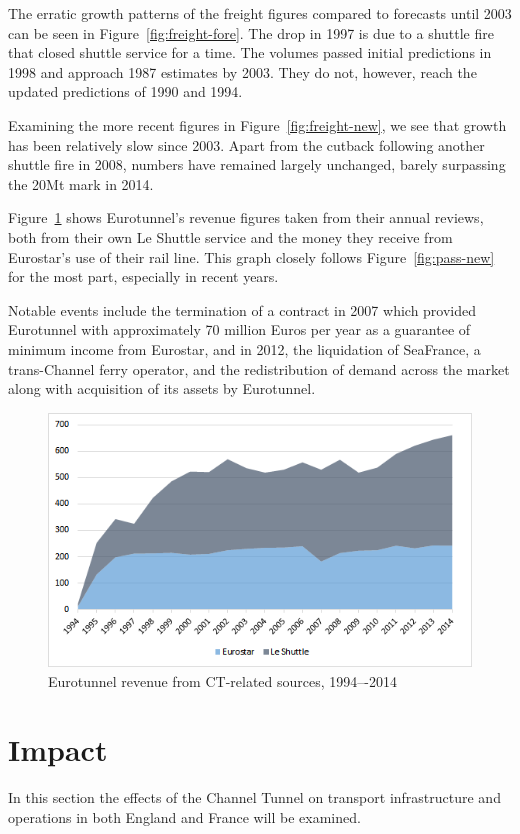 \documentclass[12pt]{article} %
\begin{document}
The erratic growth patterns of the freight figures compared to forecasts until 2003 can be seen in Figure~\ref{fig:freight-fore}. The drop in 1997 is due to a shuttle fire that closed shuttle service for a time. The volumes passed initial predictions in 1998 and approach 1987 estimates by 2003. They do not, however, reach the updated predictions of 1990 and 1994.

Examining the more recent figures in Figure~\ref{fig:freight-new}, we see that growth has been relatively slow since 2003. Apart from the cutback following another shuttle fire in 2008, numbers have remained largely unchanged, barely surpassing the 20Mt mark in 2014.

Figure~\ref{fig:revenue} shows Eurotunnel's revenue figures taken from their annual reviews\cite{et-reports}, both from their own Le Shuttle service and the money they receive from Eurostar's use of their rail line. This graph closely follows Figure~\ref{fig:pass-new} for the most part, especially in recent years. 

Notable events include the termination of a contract in 2007 which provided Eurotunnel with approximately 70 million Euros per year as a guarantee of minimum income from Eurostar, and in 2012, the liquidation of SeaFrance, a trans-Channel ferry operator, and the redistribution of demand across the market along with acquisition of its assets by Eurotunnel.\cite{et-reports}

\begin{figure}[hp]
  \centering
  \includegraphics[width=\textwidth]{revenue}
  \caption{Eurotunnel revenue from CT-related sources, 1994–-2014}
  \label{fig:revenue}
\end{figure}

\section{Impact}
In this section the effects of the Channel Tunnel on transport infrastructure and operations in both England and France will be examined.
\end{document}
